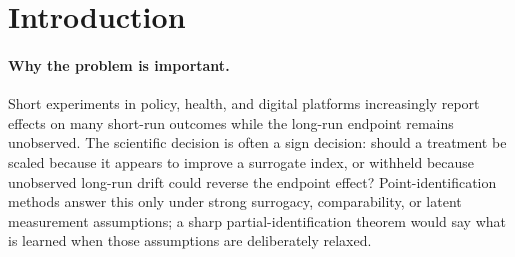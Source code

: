 \documentclass[11pt]{article}
\theoremstyle{definition}
\theoremstyle{plain}
\theoremstyle{remark}
\begin{document}
\begin{abstract}
Surrogate-index and many-proxy methods suggest that a rich short-run proxy panel can make long-run treatment effects practically estimable before the endpoint is observed.  This proposal asks for the sharp partial-identification boundary when that optimism fails because the observed proxies are noisy measurements of a latent terminal surrogate and the endpoint can drift after the last surrogate wave.  The field-tier kernel is a common-kernel finite-proxy margin conjecture: in the minimal \(K=2,J=1\) binary panel, the same measurement kernel that explains the experimental proxy law must also support an existential historical endpoint bridge law, and the resulting endpoint interval is a one-dimensional bridge-and-drift transport envelope.  A supporting negative conjecture records the sign ambiguity that motivates the boundary, but the proposal deliberately treats generic finite-LP sharpness and generic support-function tightening as prior-art machinery.  Resolving the margin statement would turn the surrogate-paradox warning into a design rule for how many proxy waves, validation restrictions, or drift-budget assumptions are needed before long-run sign decisions are defensible.
\end{abstract}

\section{Introduction}
\paragraph{Why the problem is important.}
Short experiments in policy, health, and digital platforms increasingly report effects on many short-run outcomes while the long-run endpoint remains unobserved.  The scientific decision is often a sign decision: should a treatment be scaled because it appears to improve a surrogate index, or withheld because unobserved long-run drift could reverse the endpoint effect?  Point-identification methods answer this only under strong surrogacy, comparability, or latent measurement assumptions; a sharp partial-identification theorem would say what is learned when those assumptions are deliberately relaxed.
\end{document}
